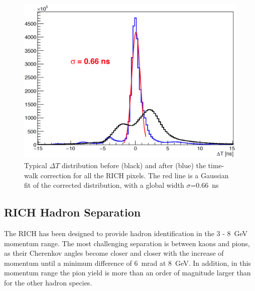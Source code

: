 \documentclass[5p,times,twocolumn]{elsarticle}
\def\dT{$\Delta T$ }
\begin{document}
\begin{figure}[h]
\begin{center}
\includegraphics[width=1.0\columnwidth]{Calibration_allch.png}
\end{center}
\caption{Typical \dT distribution before (black) and after (blue) the time-walk correction for all the RICH pixels.
The red line is a Gaussian fit of the corrected distribution, with a global width $\sigma$=0.66~ns}
\label{Fig:ResoTime}
\end{figure}


\subsection{RICH Hadron Separation}
\label{sec:HadronID}

The RICH has been designed to provide hadron identification in the 3 - 8~GeV momentum range. The most
challenging separation is between kaons and pions, as their Cherenkov angles become closer and closer with the
increase of momentum until a minimum difference of 6~mrad at 8~GeV. In addition, in this momentum range the
pion yield is more than an order of magnitude larger than for the other hadron species.

\end{document}
